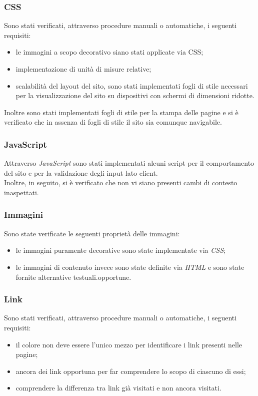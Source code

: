 \subsubsection{CSS}
\label{subsubsec:accessibility-css}

Sono stati verificati, attraverso procedure manuali o automatiche, i seguenti requisiti:
\begin{itemize}
    \item le immagini a scopo decorativo siano stati applicate via CSS;
    \item implementazione di unità di misure relative;
    \item scalabilità del layout del sito, sono stati implementati fogli di stile necessari per la visualizzazione del sito su dispositivi con schermi di dimensioni ridotte.
\end{itemize}

Inoltre sono stati implementati fogli di stile per la stampa delle pagine e si è verificato che in assenza di fogli di stile il sito sia comunque navigabile.

\subsubsection{JavaScript}
\label{subsubsec:accessibility-js}

Attraverso \textit{JavaScript} sono stati implementati alcuni script per il comportamento del sito e per la validazione degli input lato client. \\
Inoltre, in seguito, si è verificato che non vi siano presenti cambi di contesto inaspettati.

\subsubsection{Immagini}
\label{subsubsec:accessibility-images}

Sono state verificate le seguenti proprietà delle immagini:
\begin{itemize}
    \item le immagini puramente decorative sono state implementate via \textit{CSS};
    \item le immagini di contenuto invece sono state definite via \textit{HTML} e sono state fornite alternative testuali.opportune.
\end{itemize}

\subsubsection{Link}
\label{subsubsec:accessibility-links}
Sono stati verificati, attraverso procedure manuali o automatiche, i seguenti requisiti:
\begin{itemize}
    \item il colore non deve essere l'unico mezzo per identificare i link presenti nelle pagine;
    \item ancora dei link opportuna per far comprendere lo scopo di ciascuno di essi;
    \item comprendere la differenza tra link già visitati e non ancora visitati.
\end{itemize}

